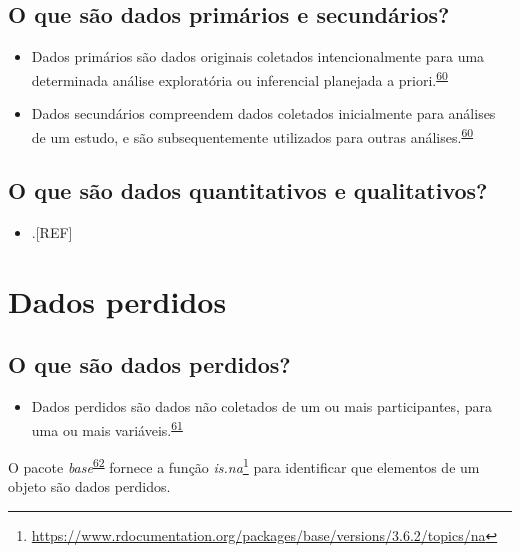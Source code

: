 \documentclass[
  a4paper,
]{book}
\providecommand{\tightlist}{%
  \setlength{\itemsep}{0pt}\setlength{\parskip}{0pt}}
\renewcommand{\href}[2]{#2\footnote{\url{#1}}}
\newenvironment{infobox}[1]
  {
  \begin{itemize}
  \renewcommand{\labelitemi}{
    \raisebox{-.7\height}[0pt][0pt]{
      {\setkeys{Gin}{width=3em,keepaspectratio}
        \texttt{[image: \#1]}}
    }
  }
  \setlength{\fboxsep}{1em}
  \begin{blackbox}
  \item
  }
  {
  \end{blackbox}
  \end{itemize}
  }
\begin{document}
\hypertarget{o-que-suxe3o-dados-primuxe1rios-e-secunduxe1rios}{%
\subsection{O que são dados primários e secundários?}\label{o-que-suxe3o-dados-primuxe1rios-e-secunduxe1rios}}

\begin{itemize}
\item
  Dados primários são dados originais coletados intencionalmente para uma determinada análise exploratória ou inferencial planejada a priori.\textsuperscript{\protect\hyperlink{ref-vetter2017}{60}}
\item
  Dados secundários compreendem dados coletados inicialmente para análises de um estudo, e são subsequentemente utilizados para outras análises.\textsuperscript{\protect\hyperlink{ref-vetter2017}{60}}
\end{itemize}

\hypertarget{o-que-suxe3o-dados-quantitativos-e-qualitativos}{%
\subsection{O que são dados quantitativos e qualitativos?}\label{o-que-suxe3o-dados-quantitativos-e-qualitativos}}

\begin{itemize}
\tightlist
\item
  .{[}REF{]}
\end{itemize}

\hypertarget{dados-perdidos}{%
\section{Dados perdidos}\label{dados-perdidos}}

\hypertarget{o-que-suxe3o-dados-perdidos}{%
\subsection{O que são dados perdidos?}\label{o-que-suxe3o-dados-perdidos}}

\begin{itemize}
\tightlist
\item
  Dados perdidos são dados não coletados de um ou mais participantes, para uma ou mais variáveis.\textsuperscript{\protect\hyperlink{ref-Altman2007}{61}}
\end{itemize}

\begin{infobox}{images/Rlogo}
O pacote \emph{base}\textsuperscript{\protect\hyperlink{ref-base-2}{62}} fornece a função \href{https://www.rdocumentation.org/packages/base/versions/3.6.2/topics/na}{\emph{is.na}} para identificar que elementos de um objeto são dados perdidos.

\end{infobox}
\end{document}
